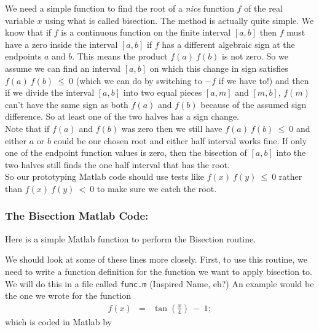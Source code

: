 \documentclass[11pt]{SelfArxOneColBMN}
\begin{document}
We need a simple function to find the root of a 
{\em nice} function $f$ of the real variable
$x$ using what is called bisection.  The method is actually
quite simple.  We know that if $f$ is a continuous function on
the finite interval $[a,b]$ then $f$ must have a zero inside the
interval $[a,b]$ if $f$ has a different algebraic sign at the endpoints
$a$ and $b$.  This means the product $f(a) \: f(b)$ is not zero.
So we assume we can find an interval $[a,b]$ on which this change in
sign satisfies $f(a) \: f(b) \: \leq \: 0$ (which we can do
by switching to $-f$ if we have to!) and then if we
divide the interval $[a,b]$ into two equal pieces
$[a,m]$ and $[m,b]$, $f(m)$ can't have the same sign as
both $f(a)$ and $f(b)$ because of the assumed sign difference.
So at least one of the two halves has a sign change.\\

\noindent
Note that if $f(a)$ and $f(b)$ was zero then we still have
$f(a) \: f(b) \: \leq \: 0$ and either $a$ or 
$b$ could be our chosen root and either half interval
works fine.  If only one of the endpoint
function values is zero, then the bisection of $[a,b]$ into the
two halves still finds the one half interval that has the root.\\

\noindent
So our prototyping Matlab code should use tests like
$f(x) \: f(y) \: \leq \: 0$ rather than
$f(x) \: f(y) \: < \: 0$ to make sure we catch the root.

\subsubsection{The Bisection Matlab Code:}

Here is a simple Matlab function to perform the Bisection routine.

\singlespacing

\onehalfspacing

\noindent
We should look at some of these lines more closely.
First, to use this routine, we need to write a function definition
for the function we want to apply bisection to.  We will do this
in a file called {\tt func.m} (Inspired Name, eh?)
An example would be the one we wrote for the function
\begin{eqnarray*}
f(x) &=& \tan(\frac{x}{4}) \: - \: 1;
\end{eqnarray*}
\noindent
which is coded in Matlab by

\singlespacing

\onehalfspacing
\end{document}
